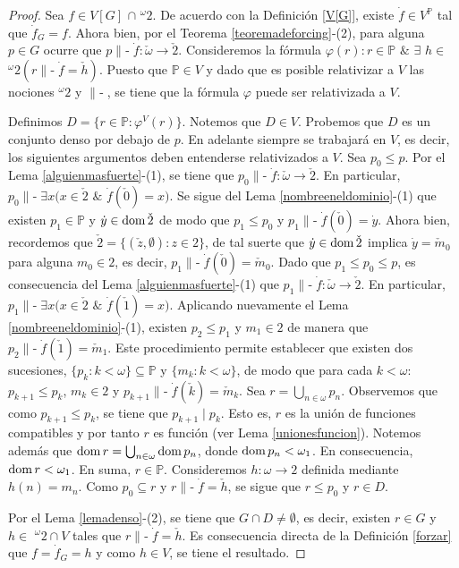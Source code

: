 \documentclass[11pt]{unam_tesis1}
\theoremstyle{MyThmStyle}
\theoremstyle{definition}
\theoremstyle{plain}
\theoremstyle{remark}
\def\dom{\mathop{\rm dom}\nolimits}
\def\forces{\mathop{\parallel\!\!\!-}\nolimits}
\let\Vdash\forces
\let\leq\leqslant
\begin{document}
\begin{proof}
Sea $f\in V[G]$ $\cap$ $^{\omega}2$. De acuerdo con la Definici\'on \ref{V[G]}, existe $\dot f\in V^{\mathbb P}$ tal que $\dot f_G=f$. Ahora bien, por el Teorema \ref{teoremadeforcing}-(2), para alguna $p\in G$ ocurre que $p\Vdash \dot f:\check \omega \to \check 2$. Consideremos la f\'ormula $\varphi(r):r\in \mathbb P$ $\&$ $\exists$ $h\in$ $^{\omega}2(r\Vdash\dot f=\check h)$. Puesto que $\mathbb P\in V$ y dado que es posible relativizar a $V$ las nociones $^{\omega}2$ y  $\Vdash$, se tiene que la f\'ormula $\varphi$ puede ser relativizada a $V$.

Definimos $D=\{r\in \mathbb P:\varphi^V(r) \}$. Notemos que $D\in V$. Probemos que $D$ es un conjunto denso por debajo de $p$. En adelante siempre se trabajar\'a en $V$, es decir, los siguientes argumentos deben entenderse relativizados a $V$. Sea $p_0\leq p$. Por el Lema \ref{alguienmasfuerte}-(1), se tiene que $p_0\Vdash \dot f:\check \omega \to \check 2$. En particular, $p_0\Vdash \exists x(x\in \check 2$ $\&$ $\dot f(\check 0)=x)$. Se sigue del Lema \ref{nombreeneldominio}-(1) que existen $p_1\in \mathbb P$ y $\dot y\in \dom \check 2$ de modo que $p_1\leq p_0$ y $p_1\Vdash \dot f(\check 0)=\dot y$. Ahora bien, recordemos que $\check 2=\{(\check z,\emptyset):z\in 2\}$, de tal suerte que $\dot y\in \dom \check 2$ implica $\dot y=\check m_0$ para alguna $m_0\in 2$, es decir, $p_1\Vdash \dot f(\check 0)=\check m_0$. Dado que $p_1\leq p_0\leq p$, es consecuencia del Lema \ref{alguienmasfuerte}-(1) que $p_1\Vdash \dot f:\check \omega \to \check 2$. En particular, $p_1\Vdash \exists x(x\in \check 2$ $\&$ $\dot f(\check 1)=x)$. Aplicando nuevamente el Lema \ref{nombreeneldominio}-(1), existen $p_2\leq p_1$ y $m_1\in 2$ de manera que $p_2\Vdash \dot f(\check 1)=\check m_1$. Este procedimiento permite establecer que existen dos sucesiones, $\{p_k:k<\omega\} \subseteq \mathbb P$ y $\{m_k:k<\omega\}$, de modo que para cada $k<\omega$: $p_{k+1}\leq p_k$, $m_k\in 2$ y $p_{k+1}\Vdash \dot f(\check k)=\check m_k$. Sea $r=\bigcup_{n\in \omega}p_n$. Observemos que como $p_{k+1}\leq p_k$, se tiene que $p_{k+1}\mid p_k$. Esto es, $r$ es la uni\'on de funciones compatibles y por tanto $r$ es funci\'on (ver Lema \ref{unionesfuncion}). Notemos adem\'as que $\dom r=\bigcup_{n\in \omega}\dom p_n$, donde $\dom p_n<\omega_1$. En consecuencia, $\dom r<\omega_1$. En suma, $r\in \mathbb P$. Consideremos $h:\omega \to 2$ definida mediante $h(n)=m_n$. Como $p_0\subseteq r$ y $r\Vdash \dot f=\check{h}$, se sigue que $r\leq p_0$ y $r\in D$.

Por el Lema \ref{lemadenso}-(2), se tiene que $G\cap D\neq \emptyset$, es decir, existen $r\in G$ y $h\in$ $^{\omega}2\cap V$ tales que $r\Vdash \dot f=\check h$. Es consecuencia directa de la Definici\'on \ref{forzar} que $f=\dot f_G=h$ y como $h\in V$, se tiene el resultado.
\end{proof}
\end{document}
